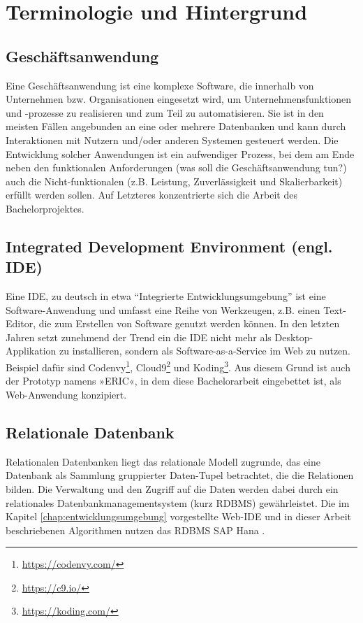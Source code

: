 \section{Terminologie und Hintergrund}\label{chap:terminology}

%
%

\subsection{Geschäftsanwendung}
Eine Geschäftsanwendung ist eine komplexe Software, die innerhalb von Unternehmen bzw. Organisationen eingesetzt wird, um Unternehmensfunktionen und -prozesse zu realisieren und zum Teil zu automatisieren.
Sie ist in den meisten Fällen angebunden an eine oder mehrere Datenbanken und kann durch Interaktionen mit Nutzern und/oder anderen Systemen gesteuert werden.
Die Entwicklung solcher Anwendungen ist ein aufwendiger Prozess, bei dem am Ende neben den funktionalen Anforderungen (was soll die Geschäftsanwendung tun?) auch die Nicht-funktionalen (z.B. Leistung, Zuverlässigkeit und Skalierbarkeit) erfüllt werden sollen.
Auf Letzteres konzentrierte sich die Arbeit des Bachelorprojektes.

\subsection{Integrated Development Environment (engl. IDE)}
Eine IDE, zu deutsch in etwa ``Integrierte Entwicklungsumgebung'' ist eine Software-Anwendung und umfasst eine Reihe von Werkzeugen, z.B. einen Text-Editor, die zum Erstellen von Software genutzt werden können.
In den letzten Jahren setzt zunehmend der Trend ein die IDE nicht mehr als Desktop-Applikation zu installieren, sondern als Software-as-a-Service \cite{SIIA} im Web zu nutzen.
Beispiel dafür sind Codenvy\footnote{\url{https://codenvy.com/}}, Cloud9\footnote{\url{https://c9.io/}} und Koding\footnote{\url{https://koding.com/}}.
Aus diesem Grund ist auch der Prototyp namens »ERIC«, in dem diese Bachelorarbeit eingebettet ist, als Web-Anwendung konzipiert.

\subsection{Relationale Datenbank}
Relationalen Datenbanken liegt das relationale Modell \cite{Codd:1970:RMD:362384.362685} zugrunde, das eine Datenbank als Sammlung gruppierter Daten-Tupel betrachtet, die die Relationen bilden.
Die Verwaltung und den Zugriff auf die Daten werden dabei durch ein relationales Datenbankmanagementsystem (kurz RDBMS) gewährleistet.
Die im Kapitel \ref{chap:entwicklungsumgebung} vorgestellte Web-IDE und in dieser Arbeit beschriebenen Algorithmen nutzen das RDBMS SAP Hana \cite{DBLP:dblp_journals/sigmod/FarberCPBSL11}.

